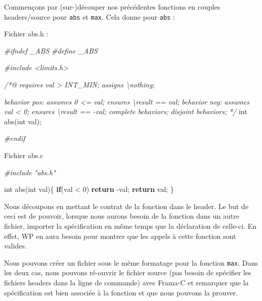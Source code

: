 \documentclass[12pt,francais,]{scrbook}
\newenvironment{Shaded}{}{}
\newcommand{\KeywordTok}[1]{\textcolor[rgb]{0.00,0.44,0.13}{\textbf{{#1}}}}
\newcommand{\DataTypeTok}[1]{\textcolor[rgb]{0.56,0.13,0.00}{{#1}}}
\newcommand{\DecValTok}[1]{\textcolor[rgb]{0.25,0.63,0.44}{{#1}}}
\newcommand{\CommentTok}[1]{\textcolor[rgb]{0.38,0.63,0.69}{\textit{{#1}}}}
\newcommand{\NormalTok}[1]{{#1}}
\begin{document}
Commençons par (sur-)découper nos précédentes fonctions en couples
headers/source pour \texttt{abs} et \texttt{max}. Cela donne pour
\texttt{abs} :

Fichier abs.h :

\begin{footnotesize}\begin{Shaded}
\begin{Highlighting}[]
\CommentTok{#ifndef _ABS}
\CommentTok{#define _ABS}

\CommentTok{#include <limits.h>}

\CommentTok{/*@}
\CommentTok{  requires val > INT_MIN;}
\CommentTok{  assigns  \textbackslash{}nothing;}

\CommentTok{  behavior pos:}
\CommentTok{    assumes 0 <= val;}
\CommentTok{    ensures \textbackslash{}result == val;}
\CommentTok{  }
\CommentTok{  behavior neg:}
\CommentTok{    assumes val < 0;}
\CommentTok{    ensures \textbackslash{}result == -val;}
\CommentTok{ }
\CommentTok{  complete behaviors;}
\CommentTok{  disjoint behaviors;}
\CommentTok{*/}
\DataTypeTok{int} \NormalTok{abs(}\DataTypeTok{int} \NormalTok{val);}

\CommentTok{#endif}
\end{Highlighting}
\end{Shaded}\end{footnotesize}

Fichier abs.c

\begin{footnotesize}\begin{Shaded}
\begin{Highlighting}[]
\CommentTok{#include "abs.h"}

\DataTypeTok{int} \NormalTok{abs(}\DataTypeTok{int} \NormalTok{val)\{}
  \KeywordTok{if}\NormalTok{(val < }\DecValTok{0}\NormalTok{) }\KeywordTok{return} \NormalTok{-val;}
  \KeywordTok{return} \NormalTok{val;}
\NormalTok{\}}
\end{Highlighting}
\end{Shaded}\end{footnotesize}

Nous découpons en mettant le contrat de la fonction dans le header. Le
but de ceci est de pouvoir, lorsque nous aurons besoin de la fonction
dans un autre fichier, importer la spécification en même temps que la
déclaration de celle-ci. En effet, WP en aura besoin pour montrer que
les appels à cette fonction sont valides.

Nous pouvons créer un fichier sous le même formatage pour la fonction
\texttt{max}. Dans les deux cas, nous pouvons ré-ouvrir le fichier
source (pas besoin de spécifier les fichiers headers dans la ligne de
commande) avec Frama-C et remarquer que la spécification est bien
associée à la fonction et que nous pouvons la prouver.
\end{document}
